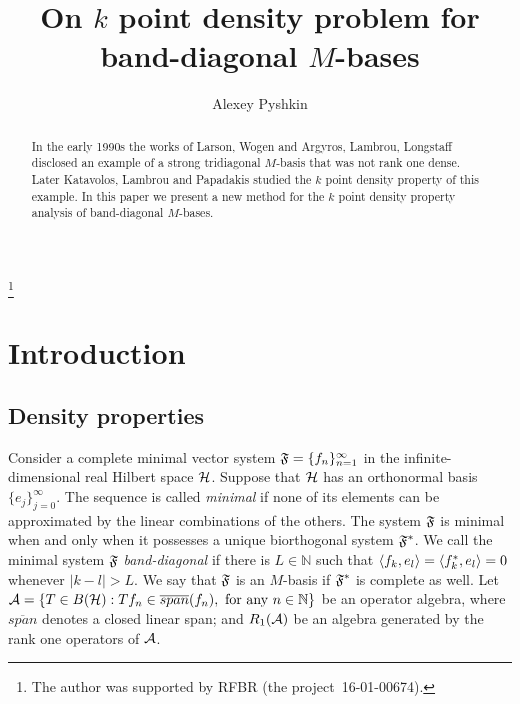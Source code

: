 \documentclass[12pt]{amsart}
\theoremstyle{case}
\begin{document}
\title{On $k$ point density problem for band-diagonal $M$-bases}
\author{Alexey Pyshkin}
\begin{abstract}
  In the early 1990s the works of Larson, Wogen and Argyros, Lambrou, Longstaff
    disclosed an example of a strong tridiagonal $M$-basis that was not rank one dense.
  Later Katavolos, Lambrou and Papadakis studied the $k$ point density property of this example.
  In this paper we present a new method for the $k$ point density property analysis of band-diagonal
    $M$-bases.
\end{abstract}
\thanks{The author was supported by RFBR (the project~16-01-00674).}
\maketitle

\section{Introduction}
  \subsection{Density properties}
    Consider a complete minimal vector system $\fsys = \seq{f}$ in the infinite-dimensional real Hilbert space $\cal{H}$.
    Suppose that $\cal{H}$ has an orthonormal basis $\{e_j\}_{j=0}^\infty$.
    The sequence is called \emph{minimal} if none of its elements can be approximated by the linear combinations of the others.
    The system $\fsys$ is minimal when and only when it possesses a unique biorthogonal system $\fstarsys$.
    We call the minimal system $\fsys$ \emph{band-diagonal} if there is $L \in \mathbb{N}$ such that $\inner{f_k}{e_l} = \inner{f^*_k}{e_l} = 0$
      whenever $\lvert k - l \rvert > L$.
    We say that $\fsys$ is an $M$-basis if $\fstarsys$ is complete as well.
    Let ${\cal{A} = \{T\in B(\cal{H}): Tf_n \in \overline{span}(f_n), \text{ for any } n \in \mathbb{N}\}}$ be an operator algebra, where
      $\overline{span}$ denotes a closed linear span;
      and $R_1(\cal{A})$ be an algebra generated by the rank one operators of $\cal{A}$.
\end{document}
